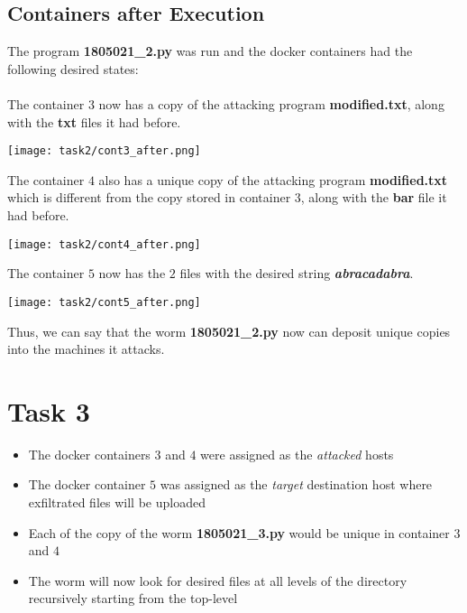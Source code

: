 \documentclass{article}
\begin{document}
\subsection{Containers after Execution}
The program \textbf{1805021\_2.py} was run and the docker containers had the following desired states:\\\\

The container $3$ now has a copy of the attacking program \textbf{modified.txt}, along with the \textbf{txt} files it had before. 
\begin{center}
    \texttt{[image: task2/cont3\_after.png]}
\end{center}

The container $4$ also has a unique copy of the attacking program \textbf{modified.txt} which is different from the copy stored in container $3$, along with the \textbf{bar} file it had before. 
\begin{center}
    \texttt{[image: task2/cont4\_after.png]}
\end{center}

The container $5$ now has the $2$ files with the desired string \textbf{\textit{abracadabra}}.
\begin{center}
    \texttt{[image: task2/cont5\_after.png]}
\end{center}

Thus, we can say that the worm \textbf{1805021\_2.py} now can deposit unique copies into the machines it attacks.


\vspace{3cm}
\section{Task 3}
 \begin{itemize}
     \item The docker containers $3$ and $4$ were assigned as the \textit{attacked} hosts
     \item The docker container $5$ was assigned as the \textit{target} destination host where exfiltrated files will be uploaded
     \item Each of the copy of the worm \textbf{1805021\_3.py} would be unique in container $3$ and $4$
     \item The worm will now look for desired files at all levels of the directory recursively starting from the top-level
 \end{itemize}
\end{document}
